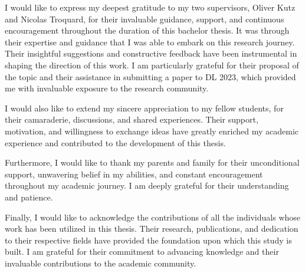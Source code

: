 I would like to express my deepest gratitude to my two supervisors, Oliver Kutz and Nicolas Troquard, for their invaluable guidance, support, and continuous encouragement throughout the duration of this bachelor thesis. It was through their expertise and guidance that I was able to embark on this research journey. Their insightful suggestions and constructive feedback have been instrumental in shaping the direction of this work. I am particularly grateful for their proposal of the topic and their assistance in submitting a paper to DL 2023, which provided me with invaluable exposure to the research community.

I would also like to extend my sincere appreciation to my fellow students, for their camaraderie, discussions, and shared experiences. Their support, motivation, and willingness to exchange ideas have greatly enriched my academic experience and contributed to the development of this thesis.

Furthermore, I would like to thank my parents and family for their unconditional support, unwavering belief in my abilities, and constant encouragement throughout my academic journey. I am deeply grateful for their understanding and patience.

Finally, I would like to acknowledge the contributions of all the individuals whose work has been utilized in this thesis. Their research, publications, and dedication to their respective fields have provided the foundation upon which this study is built. I am grateful for their commitment to advancing knowledge and their invaluable contributions to the academic community.
